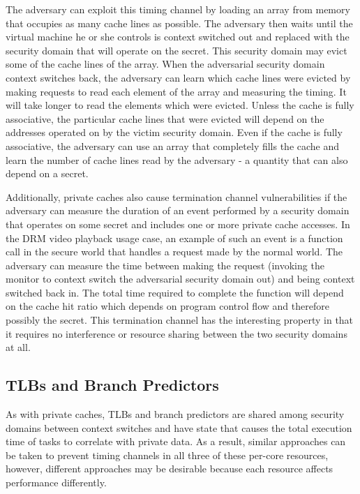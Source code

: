 The adversary can exploit this timing channel by loading an array from memory 
that occupies as many cache lines as possible. The adversary then waits until 
the virtual machine he or she controls is context switched out and replaced 
with the security domain that will operate on the secret. This security domain 
may evict some of the cache lines of the array. When the adversarial security 
domain context switches back, the adversary can learn which cache lines were 
evicted by making requests to read each element of the array and measuring the 
timing. It will take longer to read the elements which were evicted. Unless the 
cache is fully associative, the particular cache lines that were evicted will 
depend on the addresses operated on by the victim security domain. Even if the 
cache is fully associative, the adversary can use an array that completely 
fills the cache and learn the number of cache lines read by the adversary - a 
quantity that can also depend on a secret.

Additionally, private caches also cause termination channel vulnerabilities if 
the adversary can measure the duration of an event performed by a security 
domain that operates on some secret and includes one or more private cache
accesses. In the DRM video playback usage case, an example of such an event is 
a function call in the secure world that handles a request made by the normal 
world. The adversary can measure the time between making the request (invoking
the monitor to context switch the adversarial security domain out) and being 
context switched back in. The total time required to complete the function will 
depend on the cache hit ratio which depends on program control flow and 
therefore possibly the secret. This termination channel has the interesting 
property in that it requires no interference or resource sharing between the 
two security domains at all.
 
\subsection{TLBs and Branch Predictors}
As with private caches, TLBs and branch predictors are shared among security 
domains between context switches and have state that causes the total execution 
time of tasks to correlate with private data. As a result, similar approaches 
can be taken to prevent timing channels in all three of these per-core 
resources, however, different approaches may be desirable because each resource 
affects performance differently.

